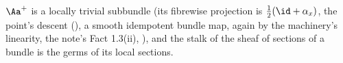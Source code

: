 $\Aa^{+}$ is a locally trivial subbundle (its fibrewise projection is $\tfrac12(\id + \alpha_x)$, the point's descent (), a smooth idempotent bundle map, again by the machinery's linearity, the note's Fact 1.3(ii), ), and the stalk of the sheaf of sections of a bundle is the germs of its local sections.
